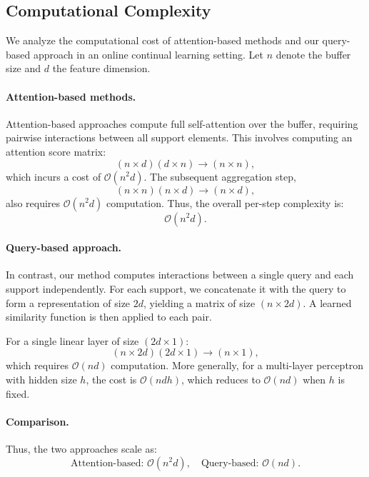 \documentclass{article}
\begin{document}
\vspace{1mm}

\noindent
{}
\label{fig:model_analysis}


\subsection{Computational Complexity}
\normalfont
\raggedright
We analyze the computational cost of attention-based methods and our query-based approach in an online continual learning setting. Let $n$ denote the buffer size and $d$ the feature dimension.

\paragraph{Attention-based methods.}
Attention-based approaches compute full self-attention over the buffer, requiring pairwise interactions between all support elements. This involves computing an attention score matrix:
\[
(n \times d)(d \times n) \rightarrow (n \times n),
\]
which incurs a cost of $\mathcal{O}(n^2 d)$. The subsequent aggregation step,
\[
(n \times n)(n \times d) \rightarrow (n \times d),
\]
also requires $\mathcal{O}(n^2 d)$ computation. Thus, the overall per-step complexity is:
\[
\mathcal{O}(n^2 d).
\]

\paragraph{Query-based approach.}
In contrast, our method computes interactions between a single query and each support independently. For each support, we concatenate it with the query to form a representation of size $2d$, yielding a matrix of size $(n \times 2d)$. A learned similarity function is then applied to each pair.

For a single linear layer of size $(2d \times 1)$:
\[
(n \times 2d)(2d \times 1) \rightarrow (n \times 1),
\]
which requires $\mathcal{O}(n d)$ computation. More generally, for a multi-layer perceptron with hidden size $h$, the cost is $\mathcal{O}(n d h)$, which reduces to $\mathcal{O}(n d)$ when $h$ is fixed.

\paragraph{Comparison.}
Thus, the two approaches scale as:
\[
\text{Attention-based: } \mathcal{O}(n^2 d), \quad
\text{Query-based: } \mathcal{O}(n d).
\]
\end{document}
